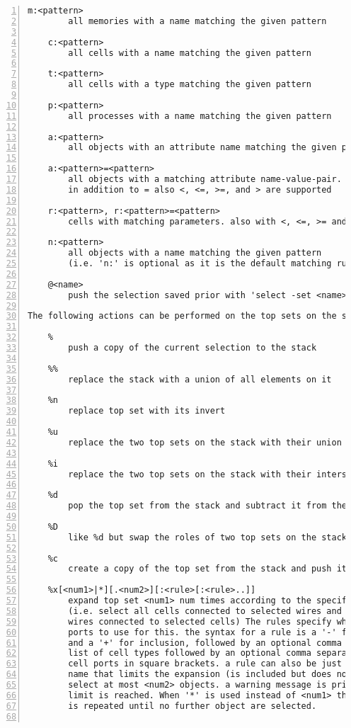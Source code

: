 \begin{lstlisting}[numbers=left,frame=single]
    m:<pattern>
        all memories with a name matching the given pattern

    c:<pattern>
        all cells with a name matching the given pattern

    t:<pattern>
        all cells with a type matching the given pattern

    p:<pattern>
        all processes with a name matching the given pattern

    a:<pattern>
        all objects with an attribute name matching the given pattern

    a:<pattern>=<pattern>
        all objects with a matching attribute name-value-pair.
        in addition to = also <, <=, >=, and > are supported

    r:<pattern>, r:<pattern>=<pattern>
        cells with matching parameters. also with <, <=, >= and >.

    n:<pattern>
        all objects with a name matching the given pattern
        (i.e. 'n:' is optional as it is the default matching rule)

    @<name>
        push the selection saved prior with 'select -set <name> ...'

The following actions can be performed on the top sets on the stack:

    %
        push a copy of the current selection to the stack

    %%
        replace the stack with a union of all elements on it

    %n
        replace top set with its invert

    %u
        replace the two top sets on the stack with their union

    %i
        replace the two top sets on the stack with their intersection

    %d
        pop the top set from the stack and subtract it from the new top

    %D
        like %d but swap the roles of two top sets on the stack

    %c
        create a copy of the top set from the stack and push it

    %x[<num1>|*][.<num2>][:<rule>[:<rule>..]]
        expand top set <num1> num times according to the specified rules.
        (i.e. select all cells connected to selected wires and select all
        wires connected to selected cells) The rules specify which cell
        ports to use for this. the syntax for a rule is a '-' for exclusion
        and a '+' for inclusion, followed by an optional comma separated
        list of cell types followed by an optional comma separated list of
        cell ports in square brackets. a rule can also be just a cell or wire
        name that limits the expansion (is included but does not go beyond).
        select at most <num2> objects. a warning message is printed when this
        limit is reached. When '*' is used instead of <num1> then the process
        is repeated until no further object are selected.


\end{lstlisting}
